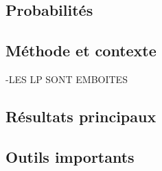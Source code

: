 \documentclass[11pt,a4paper]{article}
\begin{document}
\newpage
\begin{center}
\section*{Probabilités} 
\end{center}

%
%



\subsection*{Méthode et contexte}
-LES LP SONT EMBOITES 

\subsection*{Résultats principaux}


\subsection*{Outils importants}



\end{document}
